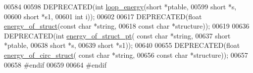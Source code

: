\begin{DoxyCode}
00584 
00598 DEPRECATED(\textcolor{keywordtype}{int}   \hyperlink{eval_8h_a507d4fd93f4b398d793ba2402731388d}{loop\_energy}(\textcolor{keywordtype}{short} *ptable,
00599                   \textcolor{keywordtype}{short} *s,
00600                   \textcolor{keywordtype}{short} *s1,
00601                   \textcolor{keywordtype}{int} i));
00602 
00617 DEPRECATED(\textcolor{keywordtype}{float} \hyperlink{eval_8h_ac2b37fea2145c94d925a3f33378ef87b}{energy\_of\_struct}(\textcolor{keyword}{const} \textcolor{keywordtype}{char} *\textcolor{keywordtype}{string},
00618                                   \textcolor{keyword}{const} \textcolor{keywordtype}{char} *structure));
00619 
00636 DEPRECATED(\textcolor{keywordtype}{int} \hyperlink{eval_8h_a27ce6f68512d43bf1fe14a06c9d76d5c}{energy\_of\_struct\_pt}( \textcolor{keyword}{const} \textcolor{keywordtype}{char} *\textcolor{keywordtype}{string},
00637                                     \textcolor{keywordtype}{short} *ptable,
00638                                     \textcolor{keywordtype}{short} *s,
00639                                     \textcolor{keywordtype}{short} *s1));
00640 
00655 DEPRECATED(\textcolor{keywordtype}{float} \hyperlink{eval_8h_a657222e2758c46bf13b416ef3032e417}{energy\_of\_circ\_struct}( \textcolor{keyword}{const} \textcolor{keywordtype}{char} *\textcolor{keywordtype}{string},
00656                                         \textcolor{keyword}{const} \textcolor{keywordtype}{char} *structure));
00657 
00658 \textcolor{preprocessor}{#endif}
00659 
00664 \textcolor{preprocessor}{#endif}
\end{DoxyCode}
